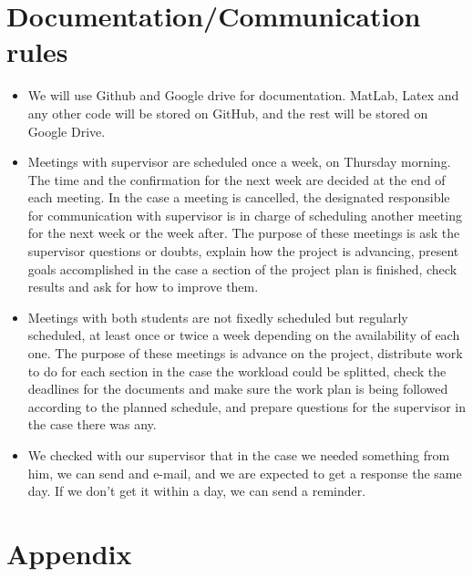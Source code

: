 \documentclass{article}
\begin{document}
	\section{Documentation/Communication rules}
	\begin{itemize}
			\item We will use Github and Google drive for documentation. MatLab, Latex and any other code will be stored on GitHub, and the rest will be stored on Google Drive.
			
			\item Meetings with supervisor are scheduled once a week, on Thursday morning. The time and the confirmation for the next week are decided at the end of each meeting. In the case a meeting is cancelled, the designated responsible for communication with supervisor is in charge of scheduling another meeting for the next week or the week after. The purpose of these meetings is ask the supervisor questions or doubts, explain how the project is advancing, present goals accomplished in the case a section of the project plan is finished, check results and ask for how to improve them.
			
			\item Meetings with both students are not fixedly scheduled but regularly scheduled, at least once or twice a week depending on the availability of each one. The purpose of these meetings is advance on the project, distribute work to do for each section in the case the workload could be splitted, check the deadlines for the documents and make sure the work plan is being followed according to the planned schedule, and prepare questions for the supervisor in the case there was any.
			
			\item We checked with our supervisor that in the case we needed something from him, we can send and e-mail, and we are expected to get a response the same day. If we don't get it within a day, we can send a reminder. 
			
	\end{itemize}

	\appendix
	\section{Appendix}
	
\end{document}
